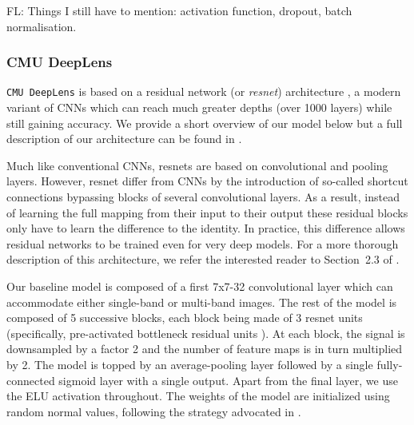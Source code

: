 \documentclass[useAMS,usenatbib]{mnras}
\newcommand{\fl}[1]{{\color{magenta}FL: #1}}
\begin{document}
\fl{Things I still have to mention: activation function, dropout, batch normalisation}.



\subsubsection{CMU DeepLens}

\texttt{CMU DeepLens} is based on a residual network (or \textit{resnet}) architecture \citep{He2015a}, a modern variant of CNNs which can reach much greater depths (over 1000 layers) while still gaining accuracy. We provide a short overview of our model below but a full description of our architecture can be found in \citet{Lanusse2017}.

Much like conventional CNNs, resnets are based on convolutional and pooling layers. However, resnet differ from CNNs by the introduction of so-called shortcut connections bypassing blocks of several convolutional layers. As a result, instead of learning the full mapping from their input to their output these residual blocks only have to learn the difference to the identity. In practice, this difference allows residual networks to be trained even for very deep models. For a more thorough description of this architecture, we refer the interested reader to Section~2.3 of \citet{Lanusse2017}.

Our baseline model is composed of a first 7x7-32 convolutional layer which can accommodate either single-band or multi-band images. The rest of the model is composed of 5 successive blocks, each block being made of 3 resnet units (specifically, pre-activated bottleneck residual units \citep{He2016}). At each block, the signal is downsampled by a factor 2 and the number of feature maps is in turn multiplied by 2. The model is topped by an average-pooling layer followed by a single fully-connected sigmoid layer with a single output. Apart from the final layer, we use the ELU activation throughout. The weights of the model are initialized using random normal values, following the strategy advocated in \citet{He2015a}. 
\end{document}
